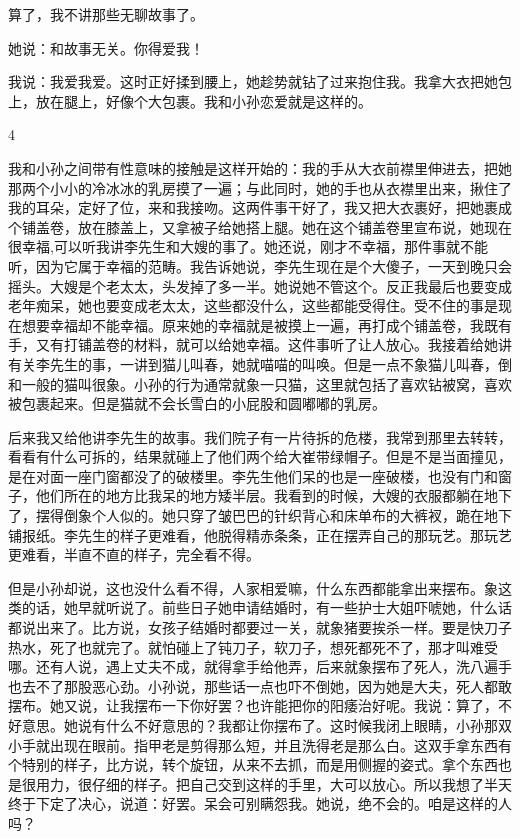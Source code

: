 算了，我不讲那些无聊故事了。 

她说：和故事无关。你得爱我！ 

我说：我爱我爱。这时正好揉到腰上，她趁势就钻了过来抱住我。我拿大衣把她包上，放在腿上，好像个大包裹。我和小孙恋爱就是这样的。 

4 

我和小孙之间带有性意味的接触是这样开始的：我的手从大衣前襟里伸进去，把她那两个小小的冷冰冰的乳房摸了一遍；与此同时，她的手也从衣襟里出来，揪住了我的耳朵，定好了位，来和我接吻。这两件事干好了，我又把大衣裹好，把她裹成个铺盖卷，放在膝盖上，又拿被子给她搭上腿。她在这个铺盖卷里宣布说，她现在很幸福,可以听我讲李先生和大嫂的事了。她还说，刚才不幸福，那件事就不能听，因为它属于幸福的范畴。我告诉她说，李先生现在是个大傻子，一天到晚只会摇头。大嫂是个老太太，头发掉了多一半。她说她不管这个。反正我最后也要变成老年痴呆，她也要变成老太太，这些都没什么，这些都能受得住。受不住的事是现在想要幸福却不能幸福。原来她的幸福就是被摸上一遍，再打成个铺盖卷，我既有手，又有打铺盖卷的材料，就可以给她幸福。这件事听了让人放心。我接着给她讲有关李先生的事，一讲到猫儿叫春，她就喵喵的叫唤。但是一点不象猫儿叫春，倒和一般的猫叫很象。小孙的行为通常就象一只猫，这里就包括了喜欢钻被窝，喜欢被包裹起来。但是猫就不会长雪白的小屁股和圆嘟嘟的乳房。 

后来我又给他讲李先生的故事。我们院子有一片待拆的危楼，我常到那里去转转，看看有什么可拆的，结果就碰上了他们两个给大崔带绿帽子。但是不是当面撞见，是在对面一座门窗都没了的破楼里。李先生他们呆的也是一座破楼，也没有门和窗子，他们所在的地方比我呆的地方矮半层。我看到的时候，大嫂的衣服都躺在地下了，摆得倒象个人似的。她只穿了皱巴巴的针织背心和床单布的大裤衩，跪在地下铺报纸。李先生的样子更难看，他脱得精赤条条，正在摆弄自己的那玩艺。那玩艺更难看，半直不直的样子，完全看不得。 

但是小孙却说，这也没什么看不得，人家相爱嘛，什么东西都能拿出来摆布。象这类的话，她早就听说了。前些日子她申请结婚时，有一些护士大姐吓唬她，什么话都说出来了。比方说，女孩子结婚时都要过一关，就象猪要挨杀一样。要是快刀子热水，死了也就完了。就怕碰上了钝刀子，软刀子，想死都死不了，那才叫难受哪。还有人说，遇上丈夫不成，就得拿手给他弄，后来就象摆布了死人，洗八遍手也去不了那股恶心劲。小孙说，那些话一点也吓不倒她，因为她是大夫，死人都敢摆布。她又说，让我摆布一下你好罢？也许能把你的阳痿治好呢。我说：算了，不好意思。她说有什么不好意思的？我都让你摆布了。这时候我闭上眼睛，小孙那双小手就出现在眼前。指甲老是剪得那么短，并且洗得老是那么白。这双手拿东西有个特别的样子，比方说，转个旋钮，从来不去抓，而是用侧握的姿式。拿个东西也是很用力，很仔细的样子。把自己交到这样的手里，大可以放心。所以我想了半天终于下定了决心，说道：好罢。呆会可别瞒怨我。她说，绝不会的。咱是这样的人吗？ 

